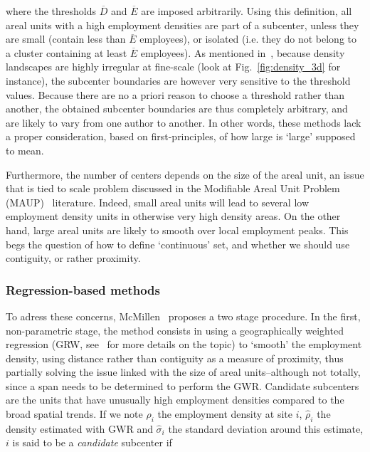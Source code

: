 where the thresholds $\overline{D}$ and $\overline{E}$ are imposed arbitrarily.
Using this definition, all areal units with a high employment densities are part
of a subcenter, unless they are small (contain less than $\overline{E}$
employees), or isolated (i.e. they do not belong to a cluster containing at
least $\overline{E}$ employees).
As mentioned in~\cite{Anas:1998}, because density landscapes are highly
irregular at fine-scale (look at Fig.~\ref{fig:density_3d} for instance), the
subcenter boundaries are however very sensitive to the threshold values. Because
there are no a priori reason to choose a threshold rather than another, the
obtained subcenter boundaries are thus completely arbitrary, and are likely to vary from one
author to another. In other words, these methods lack a proper consideration,
based on first-principles, of how large is `large' supposed to mean.

Furthermore, the number of centers depends on the size of the areal unit, an
issue that is tied to scale problem discussed in the Modifiable Areal Unit
Problem (MAUP)~\cite{Openshaw:1986} literature. Indeed, small areal units will
lead to several low employment density units in otherwise very high density
areas. On the other hand, large areal units are likely to smooth over local
employment peaks. This begs the question of how to define `continuous' set, and
whether we should use contiguity, or rather proximity.\\


\subsubsection{Regression-based methods}
\label{ssub:regression_based_methods}

To adress these concerns, McMillen~\cite{McMillen:2001} proposes a two stage
procedure. In the first, non-parametric stage, the method consists in using a
geographically weighted regression (GRW, see~\cite{Brunsdon:1998} for more details on
the topic) to `smooth' the employment density, using distance rather
than contiguity as a measure of proximity, thus partially solving the issue
linked with the size of areal units--although not totally, since a span needs to
be determined to perform the GWR. Candidate subcenters are the units that
have unusually high employment densities compared to the broad spatial trends.
If we note $\rho_i$ the employment density at site $i$, $\hat{\rho}_i$ the
density estimated with GWR and $\hat{\sigma}_i$ the standard deviation around
this estimate, $i$ is said to be a \emph{candidate} subcenter if 

